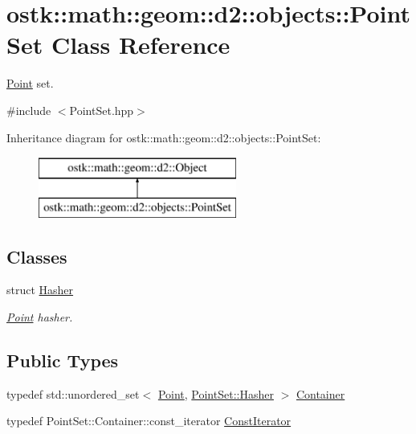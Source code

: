 \hypertarget{classostk_1_1math_1_1geom_1_1d2_1_1objects_1_1_point_set}{}\section{ostk\+:\+:math\+:\+:geom\+:\+:d2\+:\+:objects\+:\+:Point\+Set Class Reference}
\label{classostk_1_1math_1_1geom_1_1d2_1_1objects_1_1_point_set}


\hyperlink{classostk_1_1math_1_1geom_1_1d2_1_1objects_1_1_point}{Point} set.  




{\ttfamily \#include $<$Point\+Set.\+hpp$>$}

Inheritance diagram for ostk\+:\+:math\+:\+:geom\+:\+:d2\+:\+:objects\+:\+:Point\+Set\+:\begin{figure}[H]
\begin{center}
\leavevmode
\includegraphics[height=2.000000cm]{classostk_1_1math_1_1geom_1_1d2_1_1objects_1_1_point_set}
\end{center}
\end{figure}
\subsection*{Classes}
\begin{DoxyCompactItemize}
\item 
struct \hyperlink{structostk_1_1math_1_1geom_1_1d2_1_1objects_1_1_point_set_1_1_hasher}{Hasher}
\begin{DoxyCompactList}\small\item\em \hyperlink{classostk_1_1math_1_1geom_1_1d2_1_1objects_1_1_point}{Point} hasher. \end{DoxyCompactList}\end{DoxyCompactItemize}
\subsection*{Public Types}
\begin{DoxyCompactItemize}
\item 
typedef std\+::unordered\+\_\+set$<$ \hyperlink{classostk_1_1math_1_1geom_1_1d2_1_1objects_1_1_point}{Point}, \hyperlink{structostk_1_1math_1_1geom_1_1d2_1_1objects_1_1_point_set_1_1_hasher}{Point\+Set\+::\+Hasher} $>$ \hyperlink{classostk_1_1math_1_1geom_1_1d2_1_1objects_1_1_point_set_ac65ec2015127166d3aa98b163e2a7199}{Container}
\item 
typedef Point\+Set\+::\+Container\+::const\+\_\+iterator \hyperlink{classostk_1_1math_1_1geom_1_1d2_1_1objects_1_1_point_set_a6a0613cc686e9247430658eee91036d0}{Const\+Iterator}
\end{DoxyCompactItemize}

